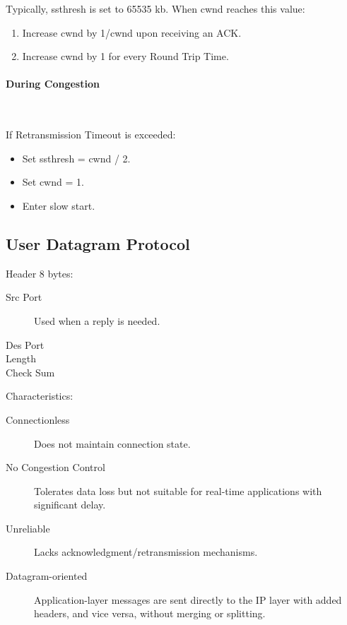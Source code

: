 \documentclass[11pt,journal,compsoc]{IEEEtran}
\begin{document}
Typically, ssthresh is set to 65535 kb. When cwnd reaches this value:

\begin{enumerate}
    \item Increase cwnd by 1/cwnd upon receiving an ACK.
    
    \item Increase cwnd by 1 for every Round Trip Time.
\end{enumerate}

\paragraph{During Congestion} ~

If Retransmission Timeout is exceeded:

\begin{itemize}
    \item Set ssthresh = cwnd / 2.
    \item Set cwnd = 1.
    \item Enter slow start.
\end{itemize}

\subsection{User Datagram Protocol}

Header 8 bytes:

\begin{description}
    \item[Src Port] Used when a reply is needed.
    
    \item[Des Port] 
    
    \item[Length] 
    
    \item[Check Sum] 
\end{description}

Characteristics:

\begin{description}
    \item[Connectionless] Does not maintain connection state.
    
    \item[No Congestion Control] Tolerates data loss but not suitable for real-time applications with significant delay.
    
    \item[Unreliable] Lacks acknowledgment/retransmission mechanisms.
    
    \item[Datagram-oriented] Application-layer messages are sent directly to the IP layer with added headers, and vice versa, without merging or splitting.
\end{description}
\end{document}
